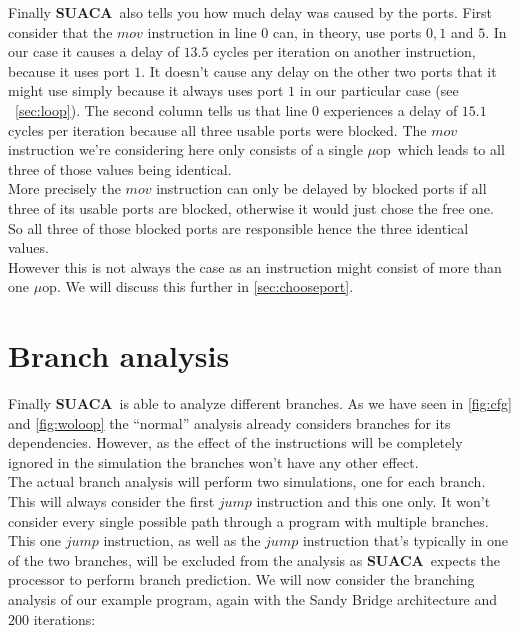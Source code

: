 \documentclass[a4paper,12pt,titlepage, twoside]{report}
\newcommand{\suaca}{\textbf{SUACA}}
\newcommand{\microop}{$\mu$op}
\begin{document}
Finally \suaca\ also tells you how much delay was caused by the ports. First consider that the $mov$ instruction in line $0$ can, in theory, use ports $0, 1$ and $5$. In our case it causes a delay of $13.5$ cycles per iteration on another instruction, because it uses port $1$. It doesn't cause any delay on the other two ports that it might use simply because it always uses port $1$ in our particular case (see ~\autoref{sec:loop}). The second column tells us that line $0$ experiences a delay of $15.1$ cycles per iteration because all three usable ports were blocked. The $mov$ instruction we're considering here only consists of a single \microop\ which leads to all three of those values being identical.\\
More precisely the $mov$ instruction can only be delayed by blocked ports if all three of its usable ports are blocked, otherwise it would just chose the free one. So all three of those blocked ports are responsible hence the three identical values.\\
However this is not always the case as an instruction might consist of more than one \microop. We will discuss this further in \autoref{sec:chooseport}.




\section{Branch analysis}

Finally \suaca\ is able to analyze different branches. As we have seen in \autoref{fig:cfg} and \autoref{fig:woloop} the ``normal'' analysis already considers branches for its dependencies. However, as the effect of the instructions will be completely ignored in the simulation the branches won't have any other effect.\\
The actual branch analysis will perform two simulations, one for each branch. This will always consider the first $jump$ instruction and this one only. It won't consider every single possible path through a program with multiple branches. This one $jump$ instruction, as well as the $jump$ instruction that's typically in one of the two branches, will be excluded from the analysis as \suaca\ expects the processor to perform branch prediction. We will now consider the branching analysis of our example program, again with the Sandy Bridge architecture and $200$ iterations:
\end{document}
